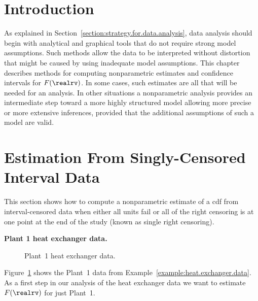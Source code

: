 \section{Introduction}
As explained in Section~\ref{section:strategy.for.data.analysis}, data
analysis should begin with analytical and graphical tools that do not
require strong model assumptions.  Such methods allow the data to
be interpreted without distortion that might be caused by using inadequate
model assumptions.  This chapter describes methods for computing
nonparametric estimates and confidence intervals for $F(\realrv)$.  In
some cases, such estimates are all that will be needed for an
analysis.  In other situations a nonparametric analysis provides an
intermediate step toward a more highly structured model allowing more
precise or more extensive inferences, provided that the additional
assumptions of such a model are valid.


\section{Estimation From Singly-Censored Interval Data}
\label{section:binomial.np}
This section shows how to compute a nonparametric estimate of a cdf
from interval-censored data when either all units fail or
all of the right censoring is at one point at the end of
the study (known as single right censoring).
\begin{example}
\label{example:heat.exchanger.p1}
{\bf Plant 1 heat exchanger data.}
\begin{figure}
\caption{Plant~1 heat exchanger data.}
\label{figure:heatex.plant1fig.ps}
\end{figure}
Figure~\ref{figure:heatex.plant1fig.ps} shows the Plant~1 data from
Example~\ref{example:heat.exchanger.data}. As a first step in our
analysis of the heat exchanger data we want to estimate
$F(\realrv)$ for just Plant~1.
\end{example}

